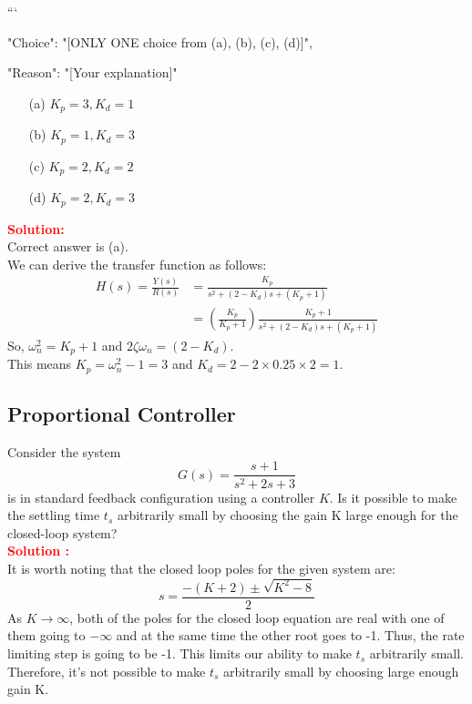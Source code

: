 \documentclass[12pt]{article}
\begin{document}
```
{

"Choice": "[ONLY ONE choice from (a), (b), (c), (d)]",

"Reason": "[Your explanation]"

}

\begin{itemize}
    \item[(a)] \(K_p = 3 , K_d = 1 \)
    \item[(b)] \(K_p = 1 , K_d = 3 \)
    \item[(c)] \(K_p = 2 , K_d = 2 \)
    \item[(d)] \(K_p = 2 , K_d = 3 \)
\end{itemize}
\noindent \textbf{\textcolor{red}{Solution:}} \\
Correct answer is (a).\\
We can derive the transfer function as follows:
\begin{equation*}
\begin{split}
H(s) =\frac{Y (s)}{R(s)} &= \frac{K_p}{s^2 + (2 - K_d )s + (K_p + 1)} \\
&= \left( \frac{K_p}{K_p+1}\right)
    \frac{K_p + 1}{s^2 + (2-K_d)s + (K_p + 1)}
\end{split}
\end{equation*}
So, $\omega^2_n = K_p + 1$ and $2\zeta \omega_n = (2-K_d)$. \\
This means $K_p = \omega^2_n - 1 = 3$ and $K_d = 2-2 \times 0.25 \times 2 = 1$.
\clearpage

\subsection{Proportional Controller}
Consider the system 
\[
G(s)=\frac{s + 1}{s^2 + 2s + 3}
\]
is in standard feedback configuration using a controller $K$. Is it possible to make the settling time $t_s$ arbitrarily small by choosing the gain K large enough for the closed-loop system? \\
\textbf{\textcolor{red}{Solution :}} \\
It is worth noting that the closed loop poles for the given system are:
\[
s =\frac{-(K + 2) \pm \sqrt{K^2 - 8}}{2}
\]
As $K \rightarrow \infty$, both of the poles for the closed loop equation are real with one of them going to $-\infty$ and at the same time the other root goes to -1. Thus, the rate limiting step is going to be -1. This limits our ability to make $t_s$ arbitrarily small. Therefore, it's not possible to make $t_s$ arbitrarily small by choosing large enough gain K.
\clearpage
\end{document}
